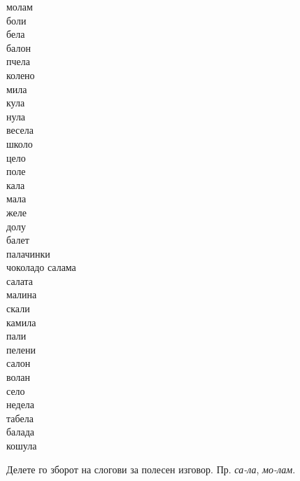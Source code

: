 \documentclass[a5paper,12pt]{article}
\newenvironment{activity}[1]{%
  \begin{tcolorbox}[colback=boxcolor,colframe=titlecolor,title={\textbf{#1}},fonttitle=\bfseries]
}{%
  \end{tcolorbox}
}
\newenvironment{instruction}{%
  \begin{tcolorbox}[colback=white,colframe=accentcolor,title={\textbf{Инструкции}},fonttitle=\bfseries] 
}{%
  \end{tcolorbox}
}
\begin{document}
\begin{activity}{Зборчиња}
  \begin{multicols}{4}
молам\\ боли\\ бела\\ балон\\ пчела\\ колено\\ мила\\ кула\\ нула\\ весела\\ школо\\ цело\\ поле\\ кала\\ мала\\ желе\\ долу\\ балет\\ палачинки\\ чоколадо
салама\\ салата\\ малина\\ скали\\ камила\\ пали\\ пелени\\ салон\\ волан\\ село\\ недела\\ табела\\ балада\\ кошула
\end{multicols}
\end{activity}

\begin{instruction}
  Делете го зборот на слогови за полесен изговор. Пр. \emph{са-ла}, \emph{мо-лам}.
\end{instruction}

\end{document}

